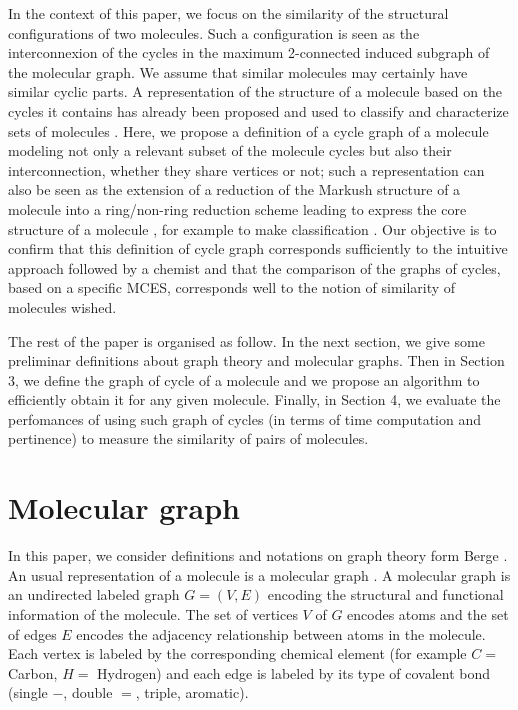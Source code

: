 \documentclass[journal=jacsat,manuscript=article]{achemso}
\begin{document}
In the context of this paper, we focus on the similarity of the structural configurations of two molecules. Such a  configuration is seen as the interconnexion of the cycles in the maximum 2-connected induced subgraph of the molecular graph. We assume that similar molecules may certainly have similar cyclic parts. A representation of the structure of a molecule based on the cycles it contains has already been proposed and used to classify and characterize sets of molecules \cite{Gauzere2013,Horvarth2004}. Here, we propose a definition of a cycle graph of a molecule modeling not only a relevant subset of the molecule cycles but also their interconnection, whether they share vertices or not; such a representation can also be seen as the extension of a reduction of the Markush structure of a molecule into a ring/non-ring reduction scheme leading to express the core structure of a molecule \cite{Lynch1996}, for example to make classification \cite{Gillet1991}. Our objective is to confirm that this definition of cycle graph corresponds sufficiently to the intuitive approach followed by a chemist and that the comparison of the graphs of cycles, based on a specific MCES, corresponds well to the notion of similarity of molecules wished.

The rest of the paper is organised as follow. In the next section, we give some preliminar definitions about graph theory and molecular graphs. Then in Section 3, we define the graph of cycle of a molecule and we propose an algorithm to efficiently obtain it for any given molecule. Finally, in Section 4, we evaluate the perfomances of using such graph of cycles (in terms of time computation and pertinence) to measure the similarity of pairs of molecules.
\section{Molecular graph}

In this paper, we consider definitions and notations on graph theory form Berge \cite{Berge1963}. An usual representation of a molecule is a molecular graph \cite{Gasteiger2003}. A molecular graph is an undirected labeled graph $G=(V,E)$ encoding the structural and functional information of the molecule. The set of vertices $V$ of $G$ encodes atoms and the set of edges $E$ encodes the adjacency relationship between atoms in the molecule. Each vertex is labeled by the corresponding chemical element (for example $C =$ Carbon, $H =$ Hydrogen) and each edge is labeled by its type of covalent bond (single $-$, double $=$, triple, aromatic).
\end{document}
